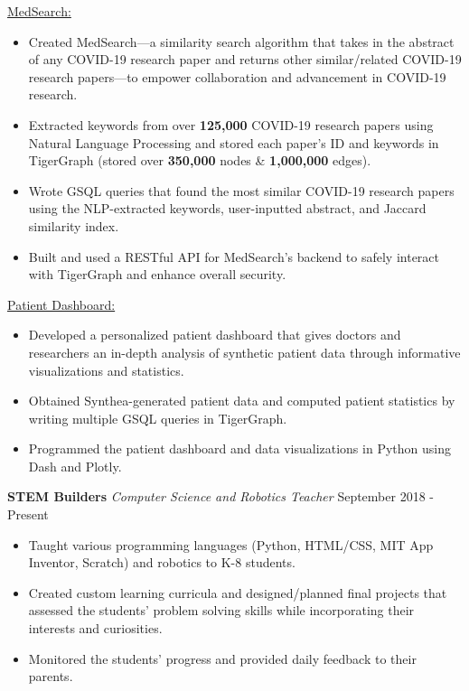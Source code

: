 \documentclass[11pt]{res}
\begin{document}
\begin{footnotesize}
\begin{resume}
\vspace{-4mm}
\underline{MedSearch:}
\vspace{-5.10mm}
\begin{itemize} \itemsep -2pt 
\item Created MedSearch—a similarity search algorithm that takes in the abstract of any COVID-19 research paper and returns other similar/related COVID-19 research papers—to empower collaboration and advancement in COVID-19 research. 
\vspace{.75mm}
\item Extracted keywords from over \textbf{125,000} COVID-19 research papers using Natural Language Processing and stored each paper's ID and keywords in TigerGraph (stored over \textbf{350,000} nodes \& \textbf{1,000,000} edges).
\vspace{.75mm}
\item Wrote GSQL queries that found the most similar COVID-19 research papers using the NLP-extracted keywords, user-inputted abstract, and Jaccard similarity index.
\vspace{.75mm}
\item Built and used a RESTful API for MedSearch's backend to safely interact with TigerGraph and enhance overall security.
\end{itemize}
\vspace{-4.75mm}
\underline{Patient Dashboard:}
\vspace{-5.10mm}
\begin{itemize} \itemsep -2pt 
\item Developed a personalized patient dashboard that gives doctors and researchers an in-depth analysis of synthetic patient data through informative visualizations and statistics. 
\vspace{.75mm}
\item Obtained Synthea-generated patient data and computed patient statistics by writing multiple GSQL queries in TigerGraph.
\vspace{-3mm}
\item Programmed the patient dashboard and data visualizations in Python using Dash and Plotly.
\end{itemize}
\vspace{-2mm}
\textbf{STEM Builders} {\sl Computer Science and Robotics Teacher} \hfill September 2018 - Present\vspace{-5.25mm}
\begin{itemize} \itemsep -2pt 
\item Taught various programming languages (Python, HTML/CSS, MIT App Inventor, Scratch) and robotics to K-8 students. 
\vspace{.75mm}
\item Created custom learning curricula and designed/planned final projects that assessed the students' problem solving skills while incorporating their interests and curiosities. 
\vspace{.75mm}
\item Monitored the students' progress and provided daily feedback to their parents.
\end{itemize}

\end{resume}
\end{footnotesize}
\end{document}
